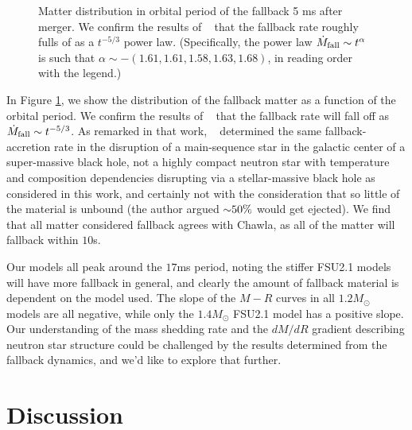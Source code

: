 \begin{figure}
	\centering
	
	\caption[Rate of fallback matter depletion]{
		Matter distribution in orbital period of the fallback 5 ms after merger.  We confirm the results of ~\cite{Chawla:2010sw} that the fallback rate roughly fulls of as a $t^{-5/3}$ power law.  (Specifically, the power law $\dot{M}_{\rm fall} \sim t^{\alpha}$ is such that $\alpha \sim -(1.61,1.61,1.58,1.63,1.68)$, in reading order with the legend.)
	}
	\label{fig:fallback}
\end{figure}

In Figure \ref{fig:fallback}, we show the distribution of the fallback matter as a function of the orbital period.  We confirm the results of ~\cite{Chawla:2010sw} that the fallback rate will fall off as $\dot{M}_{\rm fall} \sim t^{-5/3}$.  As remarked in that work, ~\cite{phinney1989manifestations} determined the same fallback-accretion rate in the disruption of a main-sequence star in the galactic center of a super-massive black hole, not a highly compact neutron star with temperature and composition dependencies disrupting via a stellar-massive black hole as considered in this work, and certainly not with the consideration that so little of the material is unbound (the author argued $\mathord{\sim} 50\%$ would get ejected).
We find that all matter considered fallback agrees with Chawla, as all of the matter will fallback within $10$s.  

Our models all peak around the $17$ms period, noting the stiffer FSU2.1 models will have more fallback in general, and clearly the amount of fallback material is dependent on the model used.  The slope of the $M-R$ curves in all $1.2 M_\odot$ models are all negative, while only the $1.4 M_\odot$ FSU2.1 model has a positive slope.  Our understanding of the mass shedding rate and the $dM/dR$ gradient describing neutron star structure could be challenged by the results determined from the fallback dynamics, and we'd like to explore that further.

\section{Discussion}
\label{sec:discussion}

